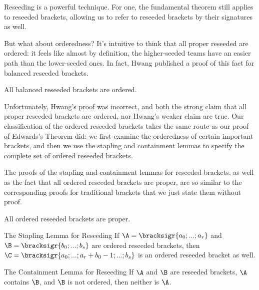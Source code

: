 {    Reseeding is a powerful technique. For one, the fundamental theorem still applies to reseeded brackets, allowing us to refer to reseeded brackets by their signatures as well.


    But what about orderedness? It's intuitive to think that all proper reseeded are ordered: it feels like almost by definition, the higher-seeded teams have an easier path than the lower-seeded ones. In fact, Hwang \cite{reseeding} published a proof of this fact for balanced reseeded brackets.

    \begin{conj}{}{}
        All balanced reseeded brackets are ordered.
    \end{conj}

    Unfortunately, Hwang's proof was incorrect, and both the strong claim that all proper reseeded brackets are ordered, nor Hwang's weaker claim are true. Our classification of the ordered reseeded brackets takes the same route as our proof of Edwards's Theorem did: we first examine the orderedness of certain important brackets, and then we use the stapling and containment lemmas to specify the complete set of ordered reseeded brackets.

    The proofs of the stapling and containment lemmas for reseeded brackets, as well as the fact that all ordered reseeded brackets are proper, are so similar to the corresponding proofs for traditional brackets that we just state them without proof.

    \begin{theorem}{}{}
        All ordered reseeded brackets are proper.
    \end{theorem}
    \begin{lemma}{The Stapling Lemma for Reseeding}{}
        If $\A = \bracksigr{a_0; ...; a_r}$ and $\B = \bracksigr{b_0; ...; b_s}$ are ordered reseeded brackets, then $\C = \bracksigr{a_0; ...; a_r + b_0 - 1; ...; b_s}$ is an ordered reseeded bracket as well.
    \end{lemma}
    \begin{lemma}{The Containment Lemma for Reseeding}{}
        If $\A$ and $\B$ are reseeded brackets, $\A$ contains $\B$, and $\B$ is not ordered, then neither is $\A$.
    \end{lemma}

}
